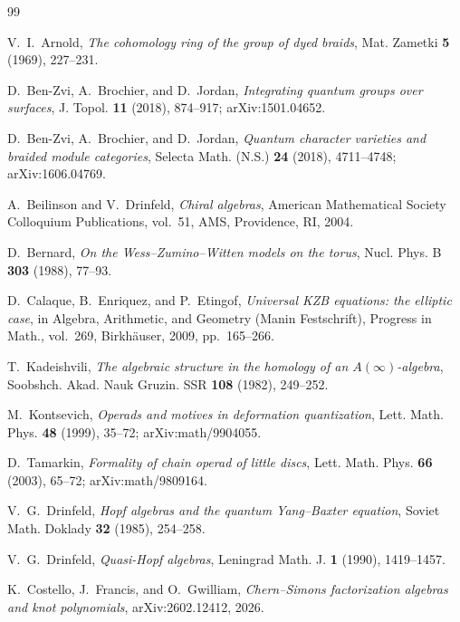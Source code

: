 \documentclass[11pt,reqno]{amsart}
\theoremstyle{definition}
\theoremstyle{remark}
\numberwithin{equation}{section}
\begin{document}
%

\begin{thebibliography}{99}

V.~I.~Arnold,
\emph{The cohomology ring of the group of dyed braids},
Mat. Zametki \textbf{5} (1969), 227--231.

D.~Ben-Zvi, A.~Brochier, and D.~Jordan,
\emph{Integrating quantum groups over surfaces},
J. Topol. \textbf{11} (2018), 874--917;
arXiv:1501.04652.

D.~Ben-Zvi, A.~Brochier, and D.~Jordan,
\emph{Quantum character varieties and braided module
categories},
Selecta Math. (N.S.) \textbf{24} (2018), 4711--4748;
arXiv:1606.04769.

A.~Beilinson and V.~Drinfeld,
\emph{Chiral algebras},
American Mathematical Society Colloquium Publications,
vol.~51, AMS, Providence, RI, 2004.

D.~Bernard,
\emph{On the Wess--Zumino--Witten models on the torus},
Nucl. Phys. B \textbf{303} (1988), 77--93.

D.~Calaque, B.~Enriquez, and P.~Etingof,
\emph{Universal KZB equations: the elliptic case},
in Algebra, Arithmetic, and Geometry (Manin Festschrift),
Progress in Math., vol.~269, Birkh\"auser, 2009,
pp.~165--266.

T.~Kadeishvili,
\emph{The algebraic structure in the homology of an
$A(\infty)$-algebra},
Soobshch. Akad. Nauk Gruzin. SSR \textbf{108} (1982),
249--252.

M.~Kontsevich,
\emph{Operads and motives in deformation quantization},
Lett. Math. Phys. \textbf{48} (1999), 35--72;
arXiv:math/9904055.

D.~Tamarkin,
\emph{Formality of chain operad of little discs},
Lett. Math. Phys. \textbf{66} (2003), 65--72;
arXiv:math/9809164.


V.~G.~Drinfeld,
\emph{Hopf algebras and the quantum Yang--Baxter equation},
Soviet Math. Doklady \textbf{32} (1985), 254--258.

V.~G.~Drinfeld,
\emph{Quasi-Hopf algebras},
Leningrad Math. J. \textbf{1} (1990), 1419--1457.


K.~Costello, J.~Francis, and O.~Gwilliam,
\emph{Chern--Simons factorization algebras and knot
polynomials},
arXiv:2602.12412, 2026.


\end{thebibliography}
\end{document}
